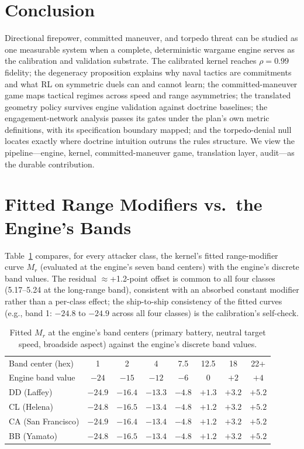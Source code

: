 \documentclass[12pt,a4paper]{article}
\begin{document}
\section{Conclusion}
Directional firepower, committed maneuver, and torpedo threat can be
studied as one measurable system when a complete, deterministic wargame
engine serves as the calibration and validation substrate.  The calibrated
kernel reaches $\rho=0.99$ fidelity; the degeneracy proposition explains
why naval tactics are commitments and what RL on symmetric duels can and
cannot learn; the committed-maneuver game maps tactical regimes across
speed and range asymmetries; the translated geometry policy survives
engine validation against doctrine baselines; the engagement-network
analysis passes its gates under the plan's own metric definitions, with
its specification boundary mapped; and the torpedo-denial null locates
exactly where doctrine intuition outruns the rules structure.  We view the
pipeline---engine, kernel, committed-maneuver game, translation layer,
audit---as the durable contribution.

\appendix
\section{Fitted Range Modifiers vs.\ the Engine's Bands}
\label{app:modifiers}
Table~\ref{tab:appendix-modifiers} compares, for every attacker class,
the kernel's fitted range-modifier curve $M_r$ (evaluated at the engine's
seven band centers) with the engine's discrete band values.  The residual
$\approx$+1.2-point offset is common to all four classes (5.17--5.24 at
the long-range band), consistent with an absorbed constant modifier
rather than a per-class effect; the ship-to-ship consistency of the
fitted curves (e.g., band 1: $-24.8$ to $-24.9$ across all four classes)
is the calibration's self-check.

\begin{table}[h]
\centering\small
\caption{Fitted $M_r$ at the engine's band centers (primary battery,
neutral target speed, broadside aspect) against the engine's discrete
band values.}
\label{tab:appendix-modifiers}
\begin{tabular}{lccccccc}
\toprule
Band center (hex) & 1 & 2 & 4 & 7.5 & 12.5 & 18 & 22+ \\
Engine band value & $-24$ & $-15$ & $-12$ & $-6$ & $0$ & $+2$ & $+4$ \\
\midrule
DD (Laffey) & $-24.9$ & $-16.4$ & $-13.3$ & $-4.8$ & $+1.3$ & $+3.2$ & $+5.2$ \\
CL (Helena) & $-24.8$ & $-16.5$ & $-13.4$ & $-4.8$ & $+1.2$ & $+3.2$ & $+5.2$ \\
CA (San Francisco) & $-24.9$ & $-16.4$ & $-13.4$ & $-4.8$ & $+1.2$ & $+3.2$ & $+5.2$ \\
BB (Yamato) & $-24.8$ & $-16.5$ & $-13.4$ & $-4.8$ & $+1.2$ & $+3.2$ & $+5.2$ \\
\bottomrule
\end{tabular}
\end{table}
\end{document}
